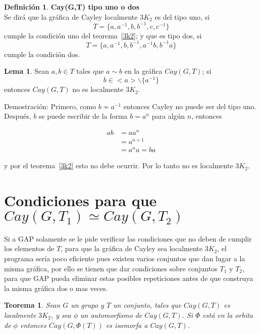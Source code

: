 \documentclass[11pt]{book}
\newtheorem{theorem}{Teorema}
\theoremstyle{definition}
\newtheorem{definition}{Definición}
\newtheorem{lemma}{Lema} \newcounter{in} \newcounter{ini}
\begin{document}
\begin{definition}\textbf{Cay(G,T) tipo uno o dos}\\
  Se dirá que la gráfica de Cayley localmente $3K_2$ es del tipo uno,
  si $$T=\{a,a^{-1},b,b^{-1},c,c^{-1} \}$$ cumple la condición uno del
  teorema~\ref{3k2}; y que es tipo dos,
  si $$T=\{a,a^{-1},b,b^{-1},a^{-1}b,b^{-1}a\}$$ cumple la condición
  dos.
\end{definition}



\begin{lemma}\label{bamnocayley}
  Sean $a,b\in T$ tales que $a\sim b$ en la gráfica $Cay(G,T)$;
  si \begin{equation*}b\in <a>\backslash \{a^{-1}\}\end{equation*}
  entonces $Cay(G,T)$ no es localmente $3K_2$.
\end{lemma}

Demostración: Primero, como $b\nsim a^{-1}$ entonces Cayley no puede
ser del tipo uno. Después, $b$ se puede escribir de la forma $b=a^n$
para algún $n$, entonces

\begin{equation*}
  \begin{split}
    ab&=aa^n\\
    &=a^{n+1}\\
    &=a^na=ba
  \end{split}
\end{equation*}

y por el teorema~\ref{3k2} esto no debe ocurrir. Por lo tanto no es
localmente $3K_2$.




\section{Condiciones para que $Cay(G,T_1)\simeq Cay(G,T_2)$}


Si a GAP solamente se le pide verificar las condiciones que no deben
de cumplir los elementos de $T$, para que la gráfica de Cayley sea
localmente $3K_2$, el programa ser\'ia poco eficiente pues existen
varios conjuntos que dan lugar a la misma gráfica, por ello se tienen
que dar condiciones sobre conjuntos $T_1$ y $T_2$, para que GAP pueda
eliminar estas posibles repeticiones antes de que construya la misma
gráfica dos o mas veces.

\begin{theorem}
  Sean $G$ un grupo y $T$ un conjunto, tales que $Cay(G,T)$ es
  localmente $3K_2$, y sea $\phi$ un automorfismo de $Cay(G,T)$. Si
  $\Phi$ está en la orbita de $\phi$ entonces $Cay(G,\Phi(T))$ es
  isomorfa a $Cay(G,T)$. \label{orbitas}
\end{theorem}
\end{document}
